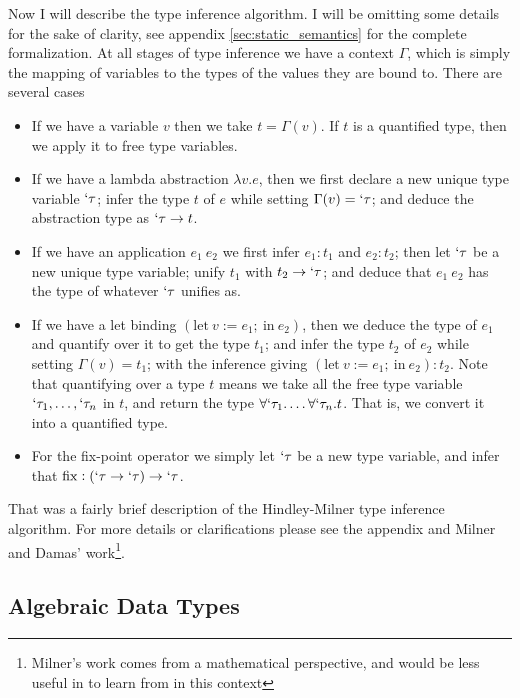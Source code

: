 \documentclass[12pt]{article}
\newcommand{\thmlet}[2]{\mathrm{let}~#1~\mathrm{in}~#2}
\newcommand{\thmfix}{\mathrm{fix}}
\begin{document}
Now I will describe the type inference algorithm.
I will be omitting some details for the sake of clarity, see appendix
\ref{sec:static_semantics} for the complete formalization.
At all stages of type inference we have a context $\Gamma$, which is
simply the mapping of variables to the types of the values they are
bound to.
There are several cases
\begin{itemize}
\item If we have a variable $v$ then we take $t = \Gamma(v)$.
  If $t$ is a quantified type, then we apply it to free type
  variables.

\item If we have a lambda abstraction $\lambda v. e$, then we first
  declare a new unique type variable $`\tau$;
  infer the type $t$ of $e$ while setting $\Gamma(v) = `\tau$; and
  deduce the abstraction type as $`\tau \to t$.

\item If we have an application $e_1~e_2$ we first infer $e_1 : t_1$
  and $e_2 : t_2$; then let $`\tau$ be a new unique type variable;
  unify $t_1$ with $t_2 \to `\tau$; and deduce that $e_1~e_2$ has the
  type of whatever $`\tau$ unifies as.

\item If we have a let binding $(\thmlet{v := e_1;}{e_2})$, then we
  deduce the type of $e_1$ and quantify over it to get the type $t_1$;
  and infer the type $t_2$ of $e_2$ while setting $\Gamma(v) = t_1$;
  with the inference giving $(\thmlet{v := e_1;}{e_2}) : t_2$.
  Note that quantifying over a type $t$ means we take all the free
  type variable $`\tau_1,\ldots,`\tau_n$ in $t$, and return the type
  $\forall `\tau_1. \ldots \forall `\tau_n. t$.
  That is, we convert it into a quantified type.

\item For the fix-point operator we simply let $`\tau$ be a new type
  variable, and infer that $\thmfix : (`\tau \to `\tau) \to `\tau$.
\end{itemize}
That was a fairly brief description of the Hindley-Milner type
inference algorithm.
For more details or clarifications please see the appendix and
Milner and Damas'
work\cite{MILNER1978,Damas1982,Damas1984}\footnote{Milner's work comes
from a mathematical perspective, and would be less useful in to learn
from in this context}.


\subsection{Algebraic Data Types}
\end{document}
